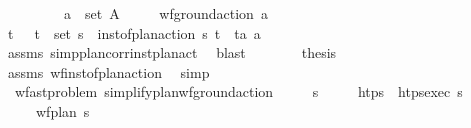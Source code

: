 \begin{isabellebody}
\ \ \ \ \ \ \ \ \ {\isachardoublequoteopen}a\ {\isasymin}\ set\ A{\isachardoublequoteclose}\isanewline
\ \ \ \ \ {\isachardoublequoteopen}wf{\isacharunderscore}{\kern0pt}ground{\isacharunderscore}{\kern0pt}action\ a{\isachardoublequoteclose}\isanewline
%
\isadelimproof
\ \ %
\endisadelimproof
%
\isatagproof
{}\isamarkupfalse%
\ {\isacharminus}{\kern0pt}\isanewline
\ \ \ \ \isamarkupfalse%
\ t\isactrlsub {\isasympi}\ {\isasympi}\ \ {\isachardoublequoteopen}{\isacharparenleft}{\kern0pt}t\isactrlsub {\isasympi}{\isacharcomma}{\kern0pt}{\isasympi}{\isacharparenright}{\kern0pt}\ {\isasymin}\ set\ {\isasympi}s{\isachardoublequoteclose}\ \ {\isachardoublequoteopen}inst{\isacharunderscore}{\kern0pt}of{\isacharunderscore}{\kern0pt}plan{\isacharunderscore}{\kern0pt}action\ {\isasympi}s\ {\isacharparenleft}{\kern0pt}t\isactrlsub {\isasympi}{\isacharcomma}{\kern0pt}\ {\isasympi}{\isacharparenright}{\kern0pt}\ {\isacharparenleft}{\kern0pt}t\isactrlsub a{\isacharcomma}{\kern0pt}\ a{\isacharparenright}{\kern0pt}{\isachardoublequoteclose}\isanewline
\ \ \ \ \ \ \isamarkupfalse%
\ assms\ simp{\isacharunderscore}{\kern0pt}plan{\isacharunderscore}{\kern0pt}corr{\isacharunderscore}{\kern0pt}inst{\isacharunderscore}{\kern0pt}plan{\isacharunderscore}{\kern0pt}act\ \isamarkupfalse%
\ blast\isanewline
\ \ \ \ \isamarkupfalse%
\ \isamarkupfalse%
\ {\isacharquery}{\kern0pt}thesis\isanewline
\ \ \ \ \ \ \isamarkupfalse%
\ assms\ wf{\isacharunderscore}{\kern0pt}inst{\isacharunderscore}{\kern0pt}of{\isacharunderscore}{\kern0pt}plan{\isacharunderscore}{\kern0pt}action\ \isamarkupfalse%
\ simp\isanewline
\ \ \isamarkupfalse%
%
\endisatagproof
{\isafoldproof}%
%
\isadelimproof
\isanewline
%
\endisadelimproof
\isanewline
\ \ \isamarkupfalse%
\ {\isacharparenleft}{\kern0pt}\ wf{\isacharunderscore}{\kern0pt}ast{\isacharunderscore}{\kern0pt}problem{\isacharparenright}{\kern0pt}\ simplify{\isacharunderscore}{\kern0pt}plan{\isacharunderscore}{\kern0pt}wf{\isacharunderscore}{\kern0pt}ground{\isacharunderscore}{\kern0pt}action{\isacharcolon}{\kern0pt}\isanewline
\ \ \ \ \ {\isasympi}s\isanewline
\ \ \ \ \ {\isachardoublequoteopen}htps\ {\isasymequiv}\ htps{\isacharunderscore}{\kern0pt}exec\ {\isasympi}s{\isachardoublequoteclose}\isanewline
\ \ \ \ \ {\isachardoublequoteopen}wf{\isacharunderscore}{\kern0pt}plan\ {\isasympi}s{\isachardoublequoteclose}\isanewline

\end{isabellebody}
